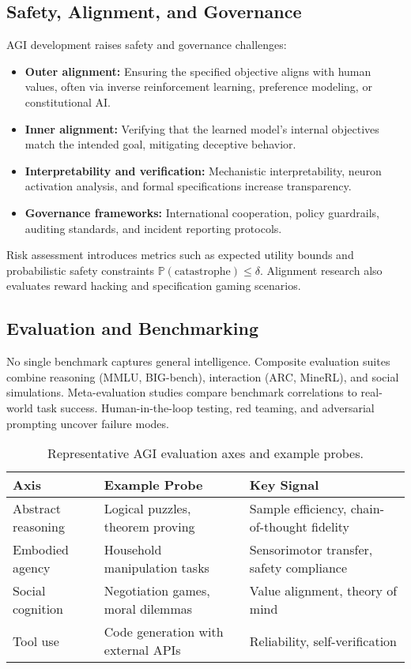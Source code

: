 \documentclass{article}
\begin{document}
\subsection{Safety, Alignment, and Governance}
AGI development raises safety and governance challenges:
\begin{itemize}
  \item \textbf{Outer alignment:} Ensuring the specified objective aligns with human values, often via inverse reinforcement learning, preference modeling, or constitutional AI.
  \item \textbf{Inner alignment:} Verifying that the learned model's internal objectives match the intended goal, mitigating deceptive behavior.
  \item \textbf{Interpretability and verification:} Mechanistic interpretability, neuron activation analysis, and formal specifications increase transparency.
  \item \textbf{Governance frameworks:} International cooperation, policy guardrails, auditing standards, and incident reporting protocols.
\end{itemize}
Risk assessment introduces metrics such as expected utility bounds and probabilistic safety constraints $\mathbb{P}(\text{catastrophe}) \le \delta$. Alignment research also evaluates reward hacking and specification gaming scenarios.

\subsection{Evaluation and Benchmarking}
No single benchmark captures general intelligence. Composite evaluation suites combine reasoning (MMLU, BIG-bench), interaction (ARC, MineRL), and social simulations. Meta-evaluation studies compare benchmark correlations to real-world task success. Human-in-the-loop testing, red teaming, and adversarial prompting uncover failure modes.

\begin{table}[H]
  \centering
  \caption{Representative AGI evaluation axes and example probes.}
  \begin{tabular}{p{} p{} p{}}
    \toprule
    Axis & Example Probe & Key Signal \\
    \midrule
    Abstract reasoning & Logical puzzles, theorem proving & Sample efficiency, chain-of-thought fidelity \\
    Embodied agency & Household manipulation tasks & Sensorimotor transfer, safety compliance \\
    Social cognition & Negotiation games, moral dilemmas & Value alignment, theory of mind \\
    Tool use & Code generation with external APIs & Reliability, self-verification \\
    \bottomrule
  \end{tabular}
  \label{tab:agi_evaluation_axes}
\end{table}
\end{document}
